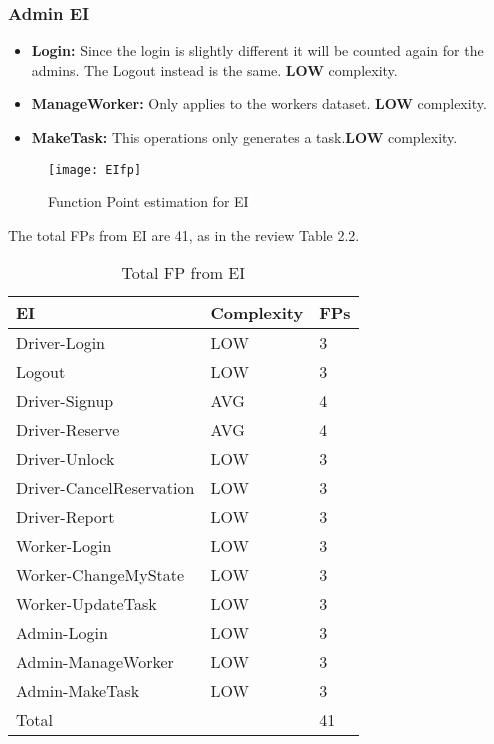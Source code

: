 \subsubsection{Admin EI}
\begin{itemize}
	\item \textbf{Login:} Since the login is slightly different it will be counted again for the admins. The Logout instead is the same. \textbf{LOW} complexity.

	\item \textbf{ManageWorker:} Only applies to the workers dataset. \textbf{LOW} complexity.
	
	\item \textbf{MakeTask:} This operations only generates a task.\textbf{LOW} complexity. 
\end{itemize}

\begin{figure}
  \centering
  \texttt{[image: EIfp]}
  \caption{Function Point estimation for EI}
\end{figure}

The total FPs from EI are 41, as in the review Table 2.2.

\begin{table}
  \centering
    \begin{tabular}{| l | l | l |}
    \hline
    \textbf{EI} & \textbf{Complexity} & \textbf{FPs} \\ \hline
    Driver-Login & LOW & 3 \\ \hline
    Logout & LOW & 3\\ \hline
    Driver-Signup & AVG & 4\\ \hline
    Driver-Reserve & AVG & 4\\ \hline
    Driver-Unlock & LOW & 3\\ \hline
    Driver-CancelReservation & LOW & 3\\ \hline
    Driver-Report & LOW & 3\\ \hline
    Worker-Login & LOW & 3\\ \hline
    Worker-ChangeMyState & LOW & 3\\ \hline
    Worker-UpdateTask & LOW & 3\\ \hline
    Admin-Login & LOW & 3\\ \hline
    Admin-ManageWorker & LOW & 3\\ \hline
    Admin-MakeTask & LOW & 3\\ \hline
    \hline
    \multicolumn{2}{|l|}{Total} & 41 \\ \hline
    \end{tabular}
  \caption{Total FP from EI}
\end{table}

